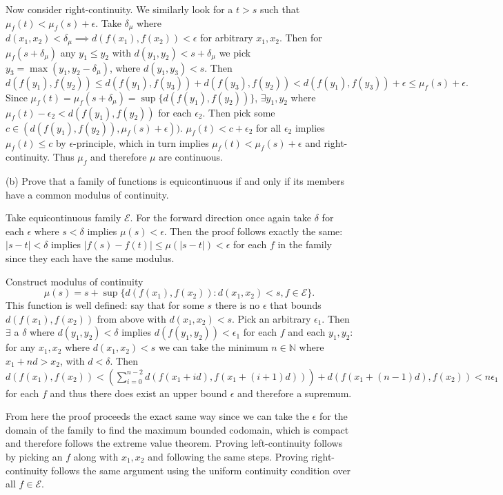 \documentclass{amsart}
\begin{document}
\medskip \noindent Now consider right-continuity. We similarly look for a $t>s$ such that $\mu_f(t)<\mu_f(s)+\epsilon$. Take $\delta_{\mu}$ where 
$d(x_1, x_2)<\delta_{\mu}\implies d(f(x_1), f(x_2))<\epsilon$ for arbitrary $x_1, x_2$. Then for $\mu_f(s+\delta_{\mu})$ any $y_1 \leq y_2$ with
$d(y_1, y_2)<s+\delta_{\mu}$ we pick $y_3=\max(y_1, y_2-\delta_{\mu})$, where $d(y_1, y_3)<s$. Then 
\[d(f(y_1), f(y_2))\leq d(f(y_1), f(y_3))+d(f(y_3), f(y_2))<d(f(y_1), f(y_3))+\epsilon\leq\mu_f(s)+\epsilon.\]
Since $\mu_f(t)=\mu_f(s+\delta_{\mu})=\sup\{d(f(y_1), f(y_2))\}$, $\exists y_1, y_2$ where $\mu_f(t)-\epsilon_2<d(f(y_1), f(y_2))$ for each $\epsilon_2$.
Then pick some $c\in (d(f(y_1), f(y_2)), \mu_f(s)+\epsilon))$. $\mu_f(t)<c+\epsilon_2$ for all $\epsilon_2$ implies
$\mu_f(t)\leq c$ by $\epsilon$-principle, which in turn implies $\mu_f(t)<\mu_f(s)+\epsilon$ and right-continuity. Thus $\mu_f$ and 
therefore $\mu$ are continuous.

\bigskip

(b) Prove that a family of functions is equicontinuous if and only if its members have a common modulus of continuity.
    
\medskip \noindent Take equicontinuous family $\mathcal{E}$. For the forward direction once again take $\delta$ for each $\epsilon$ where $s<\delta$ implies $\mu(s)<\epsilon$.
Then the proof follows exactly the same: $|s-t|<\delta$ implies $|f(s)-f(t)|\leq \mu(|s-t|)<\epsilon$ for each $f$ in the family since
they each have the same modulus.

\medskip \noindent Construct modulus of continuity \[\mu(s)=s+\sup\{d(f(x_1), f(x_2)): d(x_1, x_2)<s, f\in\mathcal{E}\}.\] This function is well defined:
say that for some $s$ there is no $\epsilon$ that bounds $d(f(x_1), f(x_2))$ from above with $d(x_1, x_2)<s$. Pick an arbitrary $\epsilon_1$. Then $\exists$ a
$\delta$ where $d(y_1, y_2)<\delta$ implies $d(f(y_1, y_2))<\epsilon_1$ for each $f$ and each $y_1, y_2$: for any $x_1, x_2$ where $d(x_1, x_2)<s$ we can take
the minimum $n\in \mathbb{N}$ where $x_1+nd>x_2$, with $d<\delta$. Then $d(f(x_1), f(x_2))< (\sum_{i=0}^{n-2}d(f(x_1+id), f(x_1+(i+1)d)))+d(f(x_1+(n-1)d), f(x_2))<n\epsilon_1$ for each $f$ and thus
there does exist an upper bound $\epsilon$ and therefore a supremum.

\medskip \noindent From here the proof proceeds the exact same way since we can take the $\epsilon$ for the domain of the family
to find the maximum bounded codomain, which is compact and therefore follows the extreme value theorem. Proving left-continuity follows by picking
an $f$ along with $x_1, x_2$ and following the same steps. Proving right-continuity follows the same argument 
using the uniform continuity condition over all $f\in\mathcal{E}$.
\end{document}
